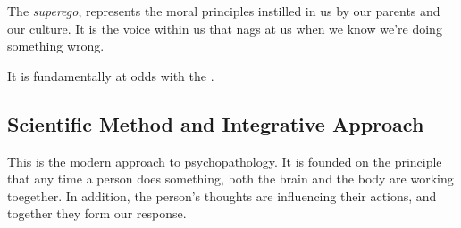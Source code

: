 \begin{definition}[Superego]\label{def:Superego}
  The \emph{superego}, represents the moral principles instilled in us by our parents and our culture.
  It is the voice within us that nags at us when we know we’re doing something wrong.

  It is fundamentally at odds with the .
\end{definition}

\subsection{Scientific Method and Integrative Approach}\label{subsec:Scientific_Method_Integrative_Approach}
This is the modern approach to psychopathology.
It is founded on the principle that any time a person does something, both the brain and the body are working toegether.
In addition, the person's thoughts are influencing their actions, and together they form our response.

